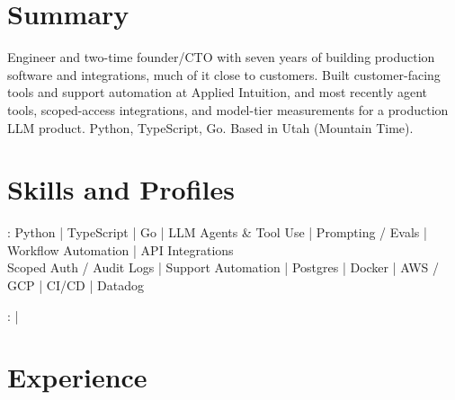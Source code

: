 \documentclass[print]{jack-resume}
\begin{document}
\pagecolor{darkmodeBackground}


\begin{minipage}[t][1cm][t]{.03\textwidth}
    \hfill
\end{minipage}

\section{Summary}
Engineer and two-time founder/CTO with seven years of building production software and integrations, much of it close to customers. Built customer-facing tools and support automation at Applied Intuition, and most recently agent tools, scoped-access integrations, and model-tier measurements for a production LLM product. Python, TypeScript, Go. Based in Utah (Mountain Time).
\sectionsep

\section{Skills and Profiles}
:
Python \hfill | \hfill
TypeScript \hfill | \hfill
Go \hfill | \hfill
LLM Agents \& Tool Use \hfill | \hfill
Prompting / Evals \hfill | \hfill
Workflow Automation \hfill | \hfill
API Integrations \\
\hspace{1.0cm} Scoped Auth / Audit Logs \hfill | \hfill
Support Automation \hfill | \hfill
Postgres \hfill | \hfill
Docker \hfill | \hfill
AWS / GCP \hfill | \hfill
CI/CD \hfill | \hfill
Datadog \\

\raggedright{
    :
      \href{https://www.linkedin.com/in/jack-sturtevant/}{ \ExternalLink} |
     \href{https://github.com/jacksturt}{ \ExternalLink}}

\section{Experience}
\end{document}
